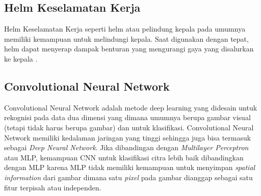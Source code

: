

\subsection{Helm Keselamatan Kerja}
\label{sec:helmkeselamatankerja}

Helm Keselamatan Kerja seperti helm atau pelindung kepala pada umumnya memiliki kemampuan untuk melindungi kepala. 
Saat digunakan dengan tepat, helm dapat menyerap dampak benturan yang mengurangi gaya yang disalurkan ke kepala \cite{kim2018safety}.


\subsection{Convolutional Neural Network}
\label{sec:convolutionalneuralnetwork}



Convolutional Neural Network adalah metode deep learning yang didesain untuk rekognisi pada data dua 
dimensi yang dimana umumnya berupa gambar visual (tetapi tidak harus berupa gambar) dan untuk klasifikasi.
Convolutional Neural Network memiliki kedalaman jaringan yang tinggi sehingga juga bisa termasuk sebagai \emph{Deep Neural Network}.
Jika dibandingan dengan \emph{Multilayer Perceptron} atau MLP, kemampuan CNN untuk klasifikasi citra lebih baik dibandingkan dengan MLP karena MLP tidak memiliki
kemampuan untuk menyimpan \emph{spatial information} dari gambar dimana satu \emph{pixel} pada gambar dianggap sebagai satu fitur
terpisah atau independen.

